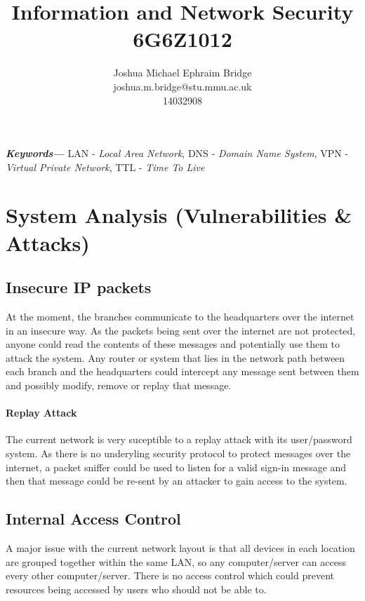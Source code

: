 \documentclass[11pt]{article}
\title{\vspace{2cm}\textbf{Information and Network Security}\\6G6Z1012}
\author{Joshua Michael Ephraim Bridge\\joshua.m.bridge@stu.mmu.ac.uk\\14032908}
\providecommand{\keywords}[1] {
  \small
  \textbf{\textit{Keywords---}} #1
}
\begin{document}
  \maketitle

  \vspace{1cm}

  \begin{abstract}

  \end{abstract}

  \vspace{0.5cm}

  \keywords{LAN - \textit{Local Area Network}, DNS - \textit{Domain Name System}, VPN - \textit{Virtual Private Network}, TTL - \textit{Time To Live}}

  \newpage


  \section{System Analysis (Vulnerabilities \& Attacks)}
    \subsection{Insecure IP packets}
      At the moment, the branches communicate to the headquarters over the internet in an insecure way. As the packets being sent over the internet are not protected, anyone could read the contents of these messages and potentially use them to attack the system. Any router or system that lies in the network path between each branch and the headquarters could intercept any message sent between them and possibly modify, remove or replay that message.

      \paragraph{Replay Attack}
        The current network is very suceptible to a replay attack with its user/password system. As there is no underyling security protocol to protect messages over the internet, a packet sniffer could be used to listen for a valid sign-in message and then that message could be re-sent by an attacker to gain access to the system.

    \subsection{Internal Access Control}
      A major issue with the current network layout is that all devices in each location are grouped together within the same LAN, so any computer/server can access every other computer/server. There is no access control which could prevent resources being accessed by users who should not be able to.
\end{document}
